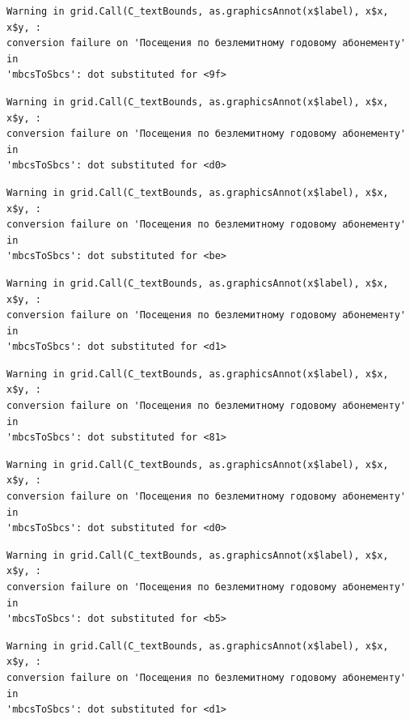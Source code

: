 \documentclass[
  letterpaper,
  DIV=11,
  numbers=noendperiod]{scrartcl}
\begin{document}
\begin{verbatim}
Warning in grid.Call(C_textBounds, as.graphicsAnnot(x$label), x$x, x$y, :
conversion failure on 'Посещения по безлемитному годовому абонементу' in
'mbcsToSbcs': dot substituted for <9f>
\end{verbatim}

\begin{verbatim}
Warning in grid.Call(C_textBounds, as.graphicsAnnot(x$label), x$x, x$y, :
conversion failure on 'Посещения по безлемитному годовому абонементу' in
'mbcsToSbcs': dot substituted for <d0>
\end{verbatim}

\begin{verbatim}
Warning in grid.Call(C_textBounds, as.graphicsAnnot(x$label), x$x, x$y, :
conversion failure on 'Посещения по безлемитному годовому абонементу' in
'mbcsToSbcs': dot substituted for <be>
\end{verbatim}

\begin{verbatim}
Warning in grid.Call(C_textBounds, as.graphicsAnnot(x$label), x$x, x$y, :
conversion failure on 'Посещения по безлемитному годовому абонементу' in
'mbcsToSbcs': dot substituted for <d1>
\end{verbatim}

\begin{verbatim}
Warning in grid.Call(C_textBounds, as.graphicsAnnot(x$label), x$x, x$y, :
conversion failure on 'Посещения по безлемитному годовому абонементу' in
'mbcsToSbcs': dot substituted for <81>
\end{verbatim}

\begin{verbatim}
Warning in grid.Call(C_textBounds, as.graphicsAnnot(x$label), x$x, x$y, :
conversion failure on 'Посещения по безлемитному годовому абонементу' in
'mbcsToSbcs': dot substituted for <d0>
\end{verbatim}

\begin{verbatim}
Warning in grid.Call(C_textBounds, as.graphicsAnnot(x$label), x$x, x$y, :
conversion failure on 'Посещения по безлемитному годовому абонементу' in
'mbcsToSbcs': dot substituted for <b5>
\end{verbatim}

\begin{verbatim}
Warning in grid.Call(C_textBounds, as.graphicsAnnot(x$label), x$x, x$y, :
conversion failure on 'Посещения по безлемитному годовому абонементу' in
'mbcsToSbcs': dot substituted for <d1>
\end{verbatim}
\end{document}
